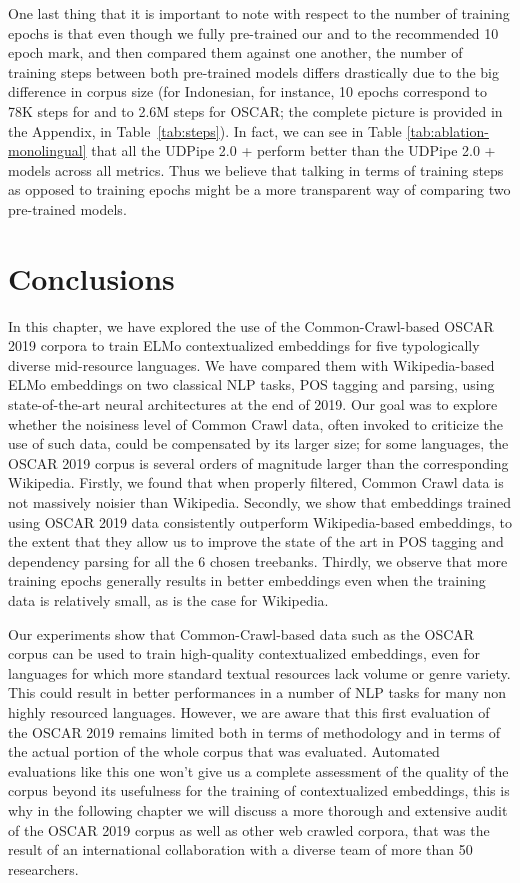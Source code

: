 One last thing that it is important to note with respect to the number of training epochs is that even though we fully pre-trained our \elmowikis and \elmooscars to the recommended 10 epoch mark, and then compared them against one another, the number of training steps between both pre-trained models differs drastically due to the big difference in corpus size (for Indonesian, for instance, 10 epochs correspond to 78K steps for \elmowiki and to 2.6M steps for OSCAR; the complete picture is provided in the Appendix, in Table~\ref{tab:steps}). In fact, we can see in Table \ref{tab:ablation-monolingual} that all the UDPipe 2.0 + \elmooscarone perform better than the UDPipe 2.0 + \elmowikione models across all metrics. Thus we believe that talking in terms of training steps as opposed to training epochs might be a more transparent way of comparing two pre-trained models.

\section{Conclusions}

In this chapter, we have explored the use of the Common-Crawl-based OSCAR 2019 corpora to train ELMo contextualized embeddings for five typologically diverse mid-resource languages. We have compared them with Wikipedia-based ELMo embeddings on two classical NLP tasks, POS tagging and parsing, using state-of-the-art neural architectures at the end of 2019. Our goal was to explore whether the noisiness level of Common Crawl data, often invoked to criticize the use of such data, could be compensated by its larger size; for some languages, the OSCAR 2019 corpus is several orders of magnitude larger than the corresponding Wikipedia. Firstly, we found that when properly filtered, Common Crawl data is not massively noisier than Wikipedia. Secondly, we show that embeddings trained using OSCAR 2019 data consistently outperform Wikipedia-based embeddings, to the extent that they allow us to improve the state of the art in POS tagging and dependency parsing for all the 6 chosen treebanks. Thirdly, we observe that more training epochs generally results in better embeddings even when the training data is relatively small, as is the case for Wikipedia.

Our experiments show that Common-Crawl-based data such as the OSCAR corpus can be used to train high-quality contextualized embeddings, even for languages for which more standard textual resources lack volume or genre variety. This could result in better performances in a number of NLP tasks for many non highly resourced languages. However, we are aware that this first evaluation of the OSCAR 2019 remains limited both in terms of methodology and in terms of the actual portion of the whole corpus that was evaluated. Automated evaluations like this one won't give us a complete assessment of the quality of the corpus beyond its usefulness for the training of contextualized embeddings, this is why in the following chapter we will discuss a more thorough and extensive audit of the OSCAR 2019 corpus as well as other web crawled corpora, that was the result of an international collaboration with a diverse team of more than 50 researchers.
